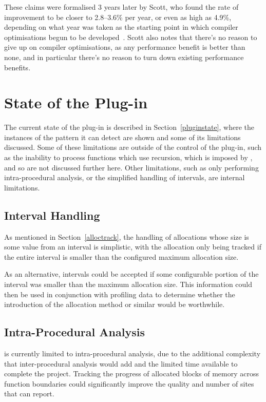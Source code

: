 These claims were formalised 3 years later by Scott, who found the rate of improvement to be closer to 2.8–3.6\% per year, or even as high as 4.9\%, depending on what year was taken as the starting point in which compiler optimisations begun to be developed~\cite{proebstingformal}. Scott also notes that there's no reason to give up on compiler optimisations, as any performance benefit is better than none, and in particular there's no reason to turn down existing performance benefits.

\section{State of the Plug-in}

The current state of the  plug-in is described in Section~\ref{pluginstate}, where the instances of the pattern it can detect are shown and some of its limitations discussed. Some of these limitations are outside of the control of the plug-in, such as the inability to process functions which use recursion, which is imposed by , and so are not discussed further here. Other limitations, such as only performing intra-procedural analysis, or the simplified handling of intervals, are internal limitations.

\subsection{Interval Handling}

As mentioned in Section~\ref{alloctrack}, the handling of allocations whose size is some value from an interval is simplistic, with the allocation only being tracked if the entire interval is smaller than the configured maximum allocation size.

As an alternative, intervals could be accepted if some configurable portion of the interval was smaller than the maximum allocation size. This information could then be used in conjunction with profiling data to determine whether the introduction of the  allocation method or similar would be worthwhile.

\subsection{Intra-Procedural Analysis}

 is currently limited to intra-procedural analysis, due to the additional complexity that inter-procedural analysis would add and the limited time available to complete the project. Tracking the progress of allocated blocks of memory across function boundaries could significantly improve the quality and number of sites that  can report.

